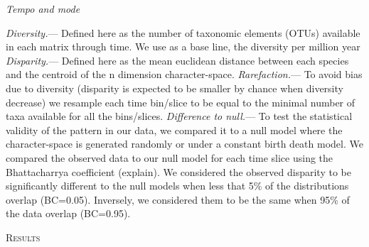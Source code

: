 \documentclass[12pt,letterpaper]{article}
\renewcommand{\section}[1]{%
\bigskip
\begin{center}
\begin{Large}
\normalfont\scshape #1
\medskip
\end{Large}
\end{center}}
\renewcommand{\subsection}[1]{%
\bigskip
\begin{center}
\begin{large}
\normalfont\itshape #1
\end{large}
\end{center}}
\renewcommand{\subsubsection}[1]{%
\vspace{2ex}
\noindent
\textit{#1.}---}
\begin{document}
\subsection{Tempo and mode}
\subsubsection{Diversity}
Defined here as the number of taxonomic elements (OTUs) available in each matrix through time. We use as a base line, the diversity per million year 
\subsubsection{Disparity}
Defined here as the mean euclidean distance between each species and the centroid of the n dimension character-space.
\subsubsection{Rarefaction}
To avoid bias due to diversity (disparity is expected to be smaller by chance when diversity decrease) we resample each time bin/slice to be equal to the minimal number of taxa available for all the bins/slices.
\subsubsection{Difference to null}
To test the statistical validity of the pattern in our data, we compared it to a null model where the character-space is generated randomly or under a constant birth death model. We compared the observed data to our null model for each time slice using the Bhattacharrya  coefficient (explain). We considered the observed disparity to be significantly different to the null models when less that 5\% of the distributions overlap (BC=0.05). Inversely, we considered them to be the same when 95\% of the data overlap (BC=0.95).

%
%

\section{Results}
\end{document}
